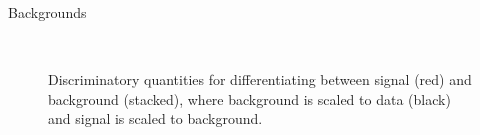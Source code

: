 \begin{section}{Backgrounds}
\begin{figure}[htb]
\begin{center}
\quad
{}\\
\quad
{}
\end{center}
\caption{Discriminatory quantities for differentiating between signal (red) and background (stacked), where background is scaled to data (black) and signal is scaled to background.}
\label{fig:bkgs}
\end{figure}
\end{section}


